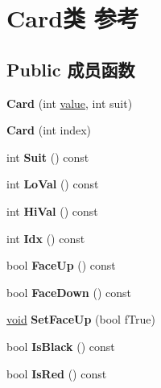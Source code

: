 \hypertarget{class_card}{}\section{Card类 参考}
\label{class_card}
\subsection*{Public 成员函数}
\begin{DoxyCompactItemize}
\item 
\mbox{\label{class_card_a9a8fd7c19af645d2d04f99eea68caf9e}} 
{\bfseries Card} (int \hyperlink{unionvalue}{value}, int suit)
\item 
\mbox{\label{class_card_a2365b8a703bc2936621dfcf49d186e73}} 
{\bfseries Card} (int index)
\item 
\mbox{\label{class_card_a2907f056935e76132e8856f349f6cf6e}} 
int {\bfseries Suit} () const
\item 
\mbox{\label{class_card_a9f4ee47c5b36e303d4f88983c83dec2d}} 
int {\bfseries Lo\+Val} () const
\item 
\mbox{\label{class_card_addc9515216e8894cccd7d5982d171f95}} 
int {\bfseries Hi\+Val} () const
\item 
\mbox{\label{class_card_ab80864715995b30603250965b305a37b}} 
int {\bfseries Idx} () const
\item 
\mbox{\label{class_card_a2e15cd444a0939ef0654905291c6d017}} 
bool {\bfseries Face\+Up} () const
\item 
\mbox{\label{class_card_abfa1ccbfac8b99fdb160ea2a6e4e9a20}} 
bool {\bfseries Face\+Down} () const
\item 
\mbox{\label{class_card_a92859daf8805afd540127a2c0084c50e}} 
\hyperlink{interfacevoid}{void} {\bfseries Set\+Face\+Up} (bool f\+True)
\item 
\mbox{\label{class_card_ab972baf7ea6ee9c13e32b9e990c80023}} 
bool {\bfseries Is\+Black} () const
\item 
\mbox{\label{class_card_a84273f681794091593b89c8bbe5c2b37}} 
bool {\bfseries Is\+Red} () const
\end{DoxyCompactItemize}
